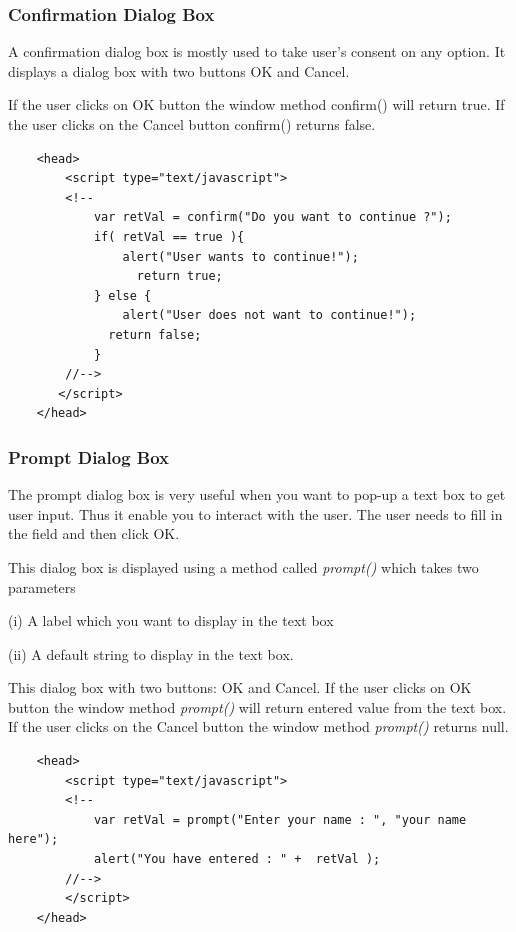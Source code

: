 \documentclass[11pt,a4paper]{article}
\begin{document}
\subsubsection*{Confirmation Dialog Box}

A confirmation dialog box is mostly used to take user's consent on any option. It displays a dialog box with two buttons OK and Cancel.

If the user clicks on OK button the window method confirm() will return true. If the user clicks on the Cancel button confirm() returns false.
\begin{verbatim}
    <head>
        <script type="text/javascript">
        <!--
            var retVal = confirm("Do you want to continue ?");
            if( retVal == true ){
                alert("User wants to continue!");
    	          return true;
            } else {
                alert("User does not want to continue!");
	          return false;
            }
        //-->
       </script>
    </head>
\end{verbatim}

\subsubsection*{Prompt Dialog Box}

The prompt dialog box is very useful when you want to pop-up a text box to get user input. Thus it enable you to interact with the user. The user needs to fill in the field and then click OK.

This dialog box is displayed using a method called \emph{prompt()} which takes two parameters

(i) A label which you want to display in the text box 

(ii) A default string to display in the text box.

This dialog box with two buttons: OK and Cancel. If the user clicks on OK button the window method \emph{prompt()} will return entered value from the text box. If the user clicks on the Cancel button the window method \emph{prompt()} returns null.
\begin{verbatim}
    <head>
        <script type="text/javascript">
        <!--
            var retVal = prompt("Enter your name : ", "your name here");
            alert("You have entered : " +  retVal );
        //-->
        </script>
    </head>
\end{verbatim}

\end{document}
